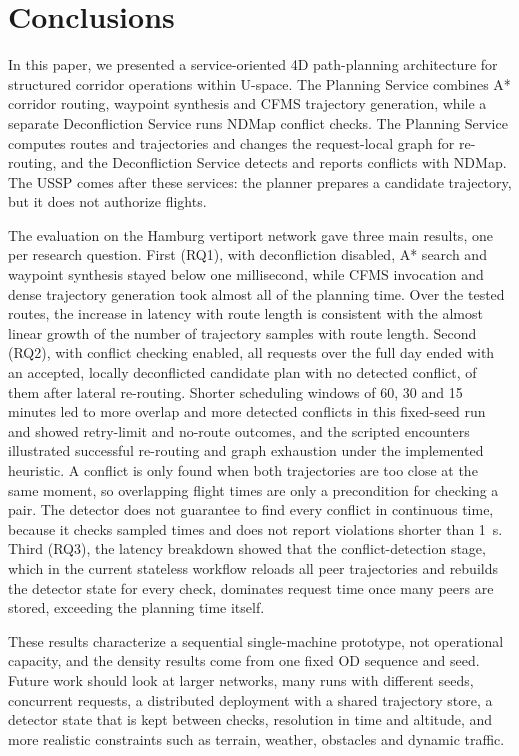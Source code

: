 \section{Conclusions}
\label{sec:conclusion}

In this paper, we presented a service-oriented 4D path-planning architecture for structured corridor operations within U-space. The Planning Service combines A* corridor routing, waypoint synthesis and CFMS trajectory generation, while a separate Deconfliction Service runs NDMap conflict checks. The Planning Service computes routes and trajectories and changes the request-local graph for re-routing, and the Deconfliction Service detects and reports conflicts with NDMap. The USSP comes after these services: the planner prepares a candidate trajectory, but it does not authorize flights.

The evaluation on the Hamburg vertiport network gave three main results, one per research question. First (RQ1), with deconfliction disabled, A* search and waypoint synthesis stayed below one millisecond, while CFMS invocation and dense trajectory generation took almost all of the planning time. Over the \paPairs{} tested routes, the increase in latency with route length is consistent with the almost linear growth of the number of trajectory samples with route length. Second (RQ2), with conflict checking enabled, all \cfRequests{} requests over the full day ended with an accepted, locally deconflicted candidate plan with no detected conflict, \cfResolved{} of them after lateral re-routing. Shorter scheduling windows of 60, 30 and 15 minutes led to more overlap and more detected conflicts in this fixed-seed run and showed retry-limit and no-route outcomes, and the scripted encounters illustrated successful re-routing and graph exhaustion under the implemented heuristic. A conflict is only found when both trajectories are too close at the same moment, so overlapping flight times are only a precondition for checking a pair. The detector does not guarantee to find every conflict in continuous time, because it checks sampled times and does not report violations shorter than \SI{1}{s}. Third (RQ3), the latency breakdown showed that the conflict-detection stage, which in the current stateless workflow reloads all peer trajectories and rebuilds the detector state for every check, dominates request time once many peers are stored, exceeding the planning time itself.

These results characterize a sequential single-machine prototype, not operational capacity, and the density results come from one fixed OD sequence and seed. Future work should look at larger networks, many runs with different seeds, concurrent requests, a distributed deployment with a shared trajectory store, a detector state that is kept between checks, resolution in time and altitude, and more realistic constraints such as terrain, weather, obstacles and dynamic traffic.

